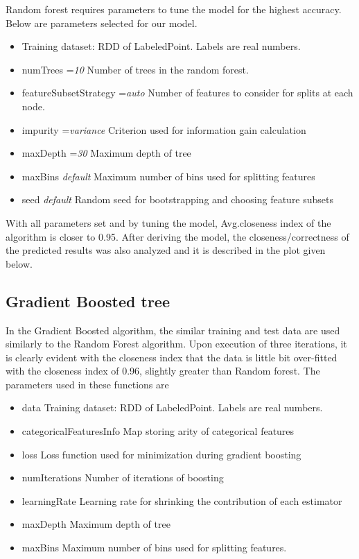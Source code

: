 \documentclass[sigconf]{acmart}
\begin{document}
Random forest requires parameters to tune the model for the highest accuracy. Below are parameters selected for our model.
\begin{itemize}
\item Training dataset: RDD of LabeledPoint. Labels are real numbers.
\item numTrees ={\em 10}   Number of trees in the random forest.
\item featureSubsetStrategy ={\em auto}   Number of features to consider for splits at each node.
\item impurity ={\em variance }  Criterion used for information gain calculation 
\item maxDepth ={\em 30 }  Maximum depth of tree
\item maxBins {\em default }   Maximum number of bins used for splitting features
\item seed {\em default }   Random seed for bootstrapping and choosing feature subsets
\end{itemize}

With all parameters set and by tuning the model, Avg.closeness index of the algorithm is closer to 0.95. After deriving the model, the closeness/correctness of the predicted results was also analyzed and it is described in the plot given below.

\subsection{Gradient Boosted tree}
In the Gradient Boosted algorithm, the similar training and test data are used similarly to the Random Forest algorithm. Upon execution of three iterations, it is clearly evident with the closeness index that the data is little bit over-fitted with the closeness index of 0.96, slightly greater than Random forest.
The parameters used in these functions are 
\begin{itemize}
\item data  Training dataset: RDD of LabeledPoint. Labels are real numbers.
\item categoricalFeaturesInfo  Map storing arity of categorical features
\item loss  Loss function used for minimization during gradient boosting
\item numIterations  Number of iterations of boosting
\item learningRate  Learning rate for shrinking the contribution of each estimator
\item maxDepth  Maximum depth of tree 
\item maxBins  Maximum number of bins used for splitting features.
\end{itemize}
\end{document}
